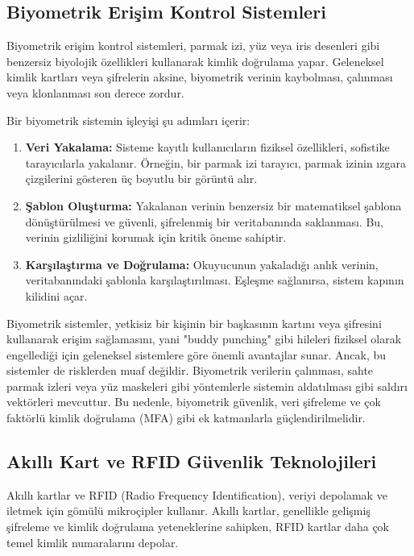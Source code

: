 \subsection{Biyometrik Erişim Kontrol Sistemleri}

Biyometrik erişim kontrol sistemleri, parmak izi, yüz veya iris desenleri gibi benzersiz biyolojik özellikleri kullanarak kimlik doğrulama yapar. Geleneksel kimlik kartları veya şifrelerin aksine, biyometrik verinin kaybolması, çalınması veya klonlanması son derece zordur.

Bir biyometrik sistemin işleyişi şu adımları içerir:

\begin{enumerate}
    \item \textbf{Veri Yakalama:} Sisteme kayıtlı kullanıcıların fiziksel özellikleri, sofistike tarayıcılarla yakalanır. Örneğin, bir parmak izi tarayıcı, parmak izinin ızgara çizgilerini gösteren üç boyutlu bir görüntü alır.
    \item \textbf{Şablon Oluşturma:} Yakalanan verinin benzersiz bir matematiksel şablona dönüştürülmesi ve güvenli, şifrelenmiş bir veritabanında saklanması. Bu, verinin gizliliğini korumak için kritik öneme sahiptir.
    \item \textbf{Karşılaştırma ve Doğrulama:} Okuyucunun yakaladığı anlık verinin, veritabanındaki şablonla karşılaştırılması. Eşleşme sağlanırsa, sistem kapının kilidini açar.
\end{enumerate}
Biyometrik sistemler, yetkisiz bir kişinin bir başkasının kartını veya şifresini kullanarak erişim sağlamasını, yani "buddy punching" gibi hileleri fiziksel olarak engellediği için geleneksel sistemlere göre önemli avantajlar sunar. Ancak, bu sistemler de risklerden muaf değildir. Biyometrik verilerin çalınması, sahte parmak izleri veya yüz maskeleri gibi yöntemlerle sistemin aldatılması gibi saldırı vektörleri mevcuttur. Bu nedenle, biyometrik güvenlik, veri şifreleme ve çok faktörlü kimlik doğrulama (MFA) gibi ek katmanlarla güçlendirilmelidir.

\subsection{Akıllı Kart ve RFID Güvenlik Teknolojileri}

Akıllı kartlar ve RFID (Radio Frequency Identification), veriyi depolamak ve iletmek için gömülü mikroçipler kullanır. Akıllı kartlar, genellikle gelişmiş şifreleme ve kimlik doğrulama yeteneklerine sahipken, RFID kartlar daha çok temel kimlik numaralarını depolar.

